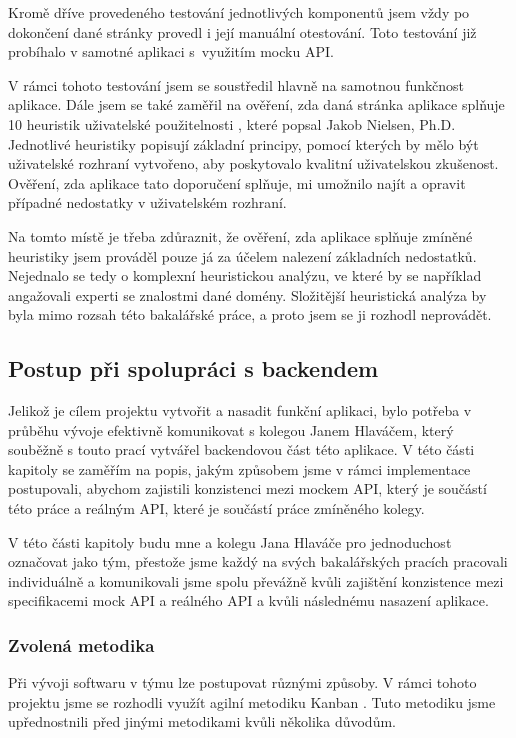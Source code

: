Kromě dříve provedeného testování jednotlivých komponentů jsem vždy po dokončení dané stránky provedl i její manuální otestování. Toto testování již probíhalo v samotné aplikaci s~využitím mocku API.

V rámci tohoto testování jsem se soustředil hlavně na samotnou funkčnost aplikace. Dále jsem se také zaměřil na ověření, zda daná stránka aplikace splňuje 10 heuristik uživatelské použitelnosti \cite{10heuristics}, které popsal {{Jakob Nielsen, Ph.D.}} Jednotlivé heuristiky popisují základní principy, pomocí kterých by mělo být uživatelské rozhraní vytvořeno, aby poskytovalo kvalitní uživatelskou zkušenost. Ověření, zda aplikace tato doporučení splňuje, mi umožnilo najít a opravit případné nedostatky v uživatelském rozhraní. 

Na tomto místě je třeba zdůraznit, že ověření, zda aplikace splňuje zmíněné heuristiky jsem prováděl pouze já za účelem nalezení základních nedostatků. Nejednalo se tedy o komplexní heuristickou analýzu, ve které by se například angažovali experti se znalostmi dané domény. Složitější heuristická analýza by byla mimo rozsah této bakalářské práce, a proto jsem se ji rozhodl neprovádět.

\subsection{Postup při spolupráci s backendem}

Jelikož je cílem projektu vytvořit a nasadit funkční aplikaci, bylo potřeba v průběhu vývoje efektivně komunikovat s kolegou Janem Hlaváčem, který souběžně s touto prací vytvářel backendovou část této aplikace. V této části kapitoly se zaměřím na popis, jakým způsobem jsme v rámci implementace postupovali, abychom zajistili konzistenci mezi mockem API, který je součástí této práce a reálným API, které je součástí práce zmíněného kolegy.

V této části kapitoly budu mne a kolegu Jana Hlaváče pro jednoduchost označovat jako tým, přestože jsme každý na svých bakalářských pracích pracovali individuálně a komunikovali jsme spolu převážně kvůli zajištění konzistence mezi specifikacemi mock API a reálného API a kvůli následnému nasazení aplikace.

\subsubsection{Zvolená metodika}

Při vývoji softwaru v týmu lze postupovat různými způsoby. V rámci tohoto projektu jsme se rozhodli využít agilní metodiku Kanban \cite{Kanban}. Tuto metodiku jsme upřednostnili před jinými metodikami kvůli několika důvodům.

